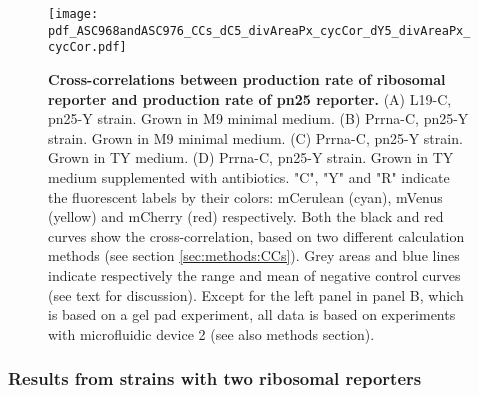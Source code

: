 \begin{figure}
    \centering
    \texttt{[image: pdf\_ASC968andASC976\_CCs\_dC5\_divAreaPx\_cycCor\_dY5\_divAreaPx\_cycCor.pdf]}
    \caption{ 
        \textbf{Cross-correlations between production rate of ribosomal reporter and production rate of pn25 reporter.}
        (A) L19-C, pn25-Y strain. Grown in M9 minimal medium.
        (B) Prrna-C, pn25-Y strain. Grown in M9 minimal medium.        
        (C) Prrna-C, pn25-Y strain. Grown in TY medium.
        (D) Prrna-C, pn25-Y strain. Grown in TY medium supplemented with antibiotics.
        "C", "Y" and "R" indicate the fluorescent labels by their colors: mCerulean (cyan), mVenus (yellow) and mCherry (red) respectively.
        Both the black and red curves show the cross-correlation, based on two different calculation methods (see section \ref{sec:methods:CCs}).
        Grey areas and blue lines indicate respectively the range and mean of negative control curves (see text for discussion).
        Except for the left panel in panel B, which is based on a gel pad experiment, all data is based on experiments with microfluidic device 2 (see also methods section).
    }
    \label{fig:ribo:CCsPRiboPn25}
\end{figure}




\subsubsection{Results from strains with two ribosomal reporters}

